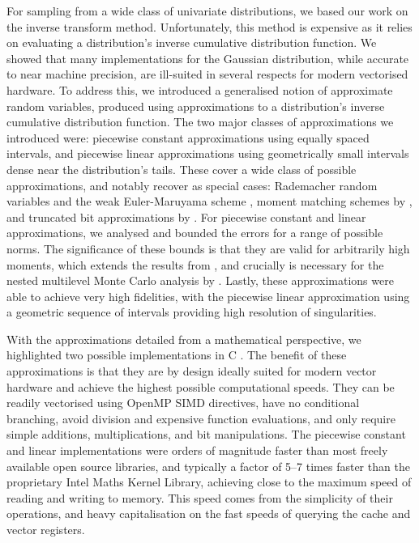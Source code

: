 \documentclass[manuscript,review]{acmart}
\begin{document}
For sampling from a wide class of univariate distributions, we based our work on the inverse transform method. Unfortunately, this method is expensive as it relies on evaluating a distribution's inverse cumulative distribution function. We showed that many implementations for the Gaussian distribution, while accurate to near machine precision, are ill-suited in several respects for modern vectorised hardware. To address this, we introduced a generalised notion of approximate random variables, produced using approximations to a distribution's inverse cumulative distribution function. The two major classes of approximations we introduced were: piecewise constant approximations using equally spaced intervals, and piecewise linear approximations using geometrically small intervals dense near the distribution's tails. These cover a wide class of possible approximations, and notably recover as special cases: Rademacher random variables and the weak Euler-Maruyama scheme \citep{glasserman2013monte}, moment matching schemes by \citet{muller2015improving}, and truncated bit approximations by \citet{giles2019random_quadrature}. For piecewise constant and linear approximations, we analysed and bounded the errors for a range of possible norms. The significance of these bounds is that they are valid for arbitrarily high moments, which extends the results from \citet{giles2019random_quadrature}, and crucially is necessary for the nested multilevel Monte Carlo analysis by \citet{giles2020approximate}. Lastly, these approximations were able to achieve very high fidelities, with the piecewise linear approximation using a geometric sequence of intervals providing high resolution of singularities.

With the approximations detailed from a mathematical perspective, we highlighted two possible implementations in C \citep{sheridan2020approximate_random}. The benefit of these approximations is that they are by design ideally suited for modern vector hardware and achieve the highest possible computational speeds. They can be readily vectorised using OpenMP SIMD directives, have no conditional branching, avoid division and expensive function evaluations, and only require simple additions, multiplications, and bit manipulations. The piecewise constant and linear implementations were orders of magnitude faster than most freely available open source libraries, and typically a factor of 5--7 times faster than the proprietary Intel Maths Kernel Library, achieving close to the maximum speed of reading and writing to memory. This speed comes from the simplicity of their operations, and heavy capitalisation on the fast speeds of querying the cache and vector registers. 
\end{document}

